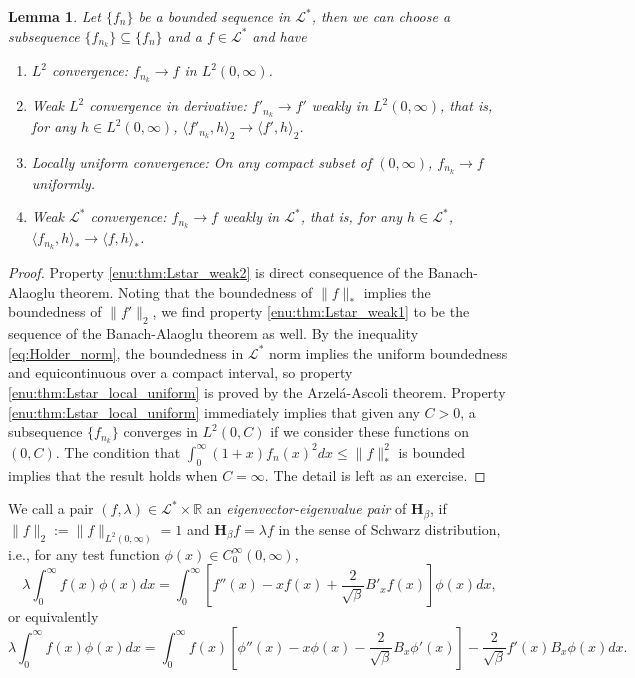 \documentclass[11pt, a4paper]{article}
\numberwithin{equation}{section}
\newcommand{\realR}{\mathbb{R}}
\newcommand{\ie}{i.e.}
\newcommand{\Lstar}{\mathcal{L}^*}
\newcommand{\Hbeta}{\mathbf{H}_{\beta}}
\newcommand{\Arzela}{Arzel\'{a}}
\newtheorem{lem}{Lemma}
\theoremstyle{definition}
\theoremstyle{remark}
\begin{document}
\begin{lem}
  Let $\{ f_n \}$ be a bounded sequence in $\Lstar$, then we can choose a subsequence $\{ f_{n_k} \} \subseteq \{ f_n \}$ and a $f \in \Lstar$ and have
  \begin{enumerate}
  \item \label{enu:thm:Lstar_L^2}
    $L^2$ convergence: $f_{n_k} \to f$ in $L^2(0, \infty)$.
  \item  \label{enu:thm:Lstar_weak1}
    Weak $L^2$ convergence in derivative: $f'_{n_k} \to f'$ weakly in $L^2(0, \infty)$, that is, for any $h \in L^2(0, \infty)$, $\langle f'_{n_k}, h \rangle_2 \to \langle f', h \rangle_2$.
  \item \label{enu:thm:Lstar_local_uniform}
    Locally uniform convergence: On any compact subset of $(0, \infty)$, $f_{n_k} \to f$ uniformly.
  \item \label{enu:thm:Lstar_weak2}
    Weak $\Lstar$ convergence: $f_{n_k} \to f$ weakly in $\Lstar$, that is, for any $h \in \Lstar$, $\langle f_{n_k}, h \rangle_* \to \langle f, h \rangle_*$.
  \end{enumerate}
\end{lem}
\begin{proof}
  Property \ref{enu:thm:Lstar_weak2} is direct consequence of the Banach-Alaoglu theorem. Noting that the boundedness of $\lVert f \rVert_*$ implies the boundedness of $\lVert f' \rVert_2$, we find property \ref{enu:thm:Lstar_weak1} to be the sequence of the Banach-Alaoglu theorem as well. By the inequality \eqref{eq:Holder_norm}, the boundedness in $\Lstar$ norm implies the uniform boundedness and equicontinuous over a compact interval, so property \ref{enu:thm:Lstar_local_uniform} is proved by the \Arzela-Ascoli theorem. Property \ref{enu:thm:Lstar_local_uniform} immediately implies that given any $C > 0$, a subsequence $\{ f_{n_k} \}$ converges in $L^2(0, C)$ if we consider these functions on $(0, C)$. The condition that $\int^{\infty}_0 (1 + x) f_n(x)^2 dx \leq \lVert f \rVert^2_*$ is bounded implies that the result holds when $C = \infty$. The detail is left as an exercise.
\end{proof}

We call a pair $(f, \lambda) \in \Lstar \times \realR$ an \emph{eigenvector-eigenvalue pair} of $\Hbeta$, if $\lVert f \rVert_2 := \lVert f \rVert_{L^2(0, \infty)} = 1$ and $\Hbeta f = \lambda f$ in the sense of Schwarz distribution, \ie, for any test  function $\phi(x) \in C^{\infty}_0(0, \infty)$,
\begin{equation} \label{eq:defining_prop_pair:1}
  \lambda \int^{\infty}_0 f(x) \phi(x) dx = \int^{\infty}_0 \left[ f''(x) - xf(x) + \frac{2}{\sqrt{\beta}} B'_x f(x) \right] \phi(x) dx,
\end{equation}
or equivalently
\begin{equation} \label{eq:defining_prop_pair:2}
  \lambda \int^{\infty}_0 f(x) \phi(x) dx = \int^{\infty}_0 f(x) \left[ \phi''(x) - x \phi(x) - \frac{2}{\sqrt{\beta}} B_x \phi'(x) \right] - \frac{2}{\sqrt{\beta}} f'(x) B_x \phi(x) dx.
\end{equation}
\end{document}
